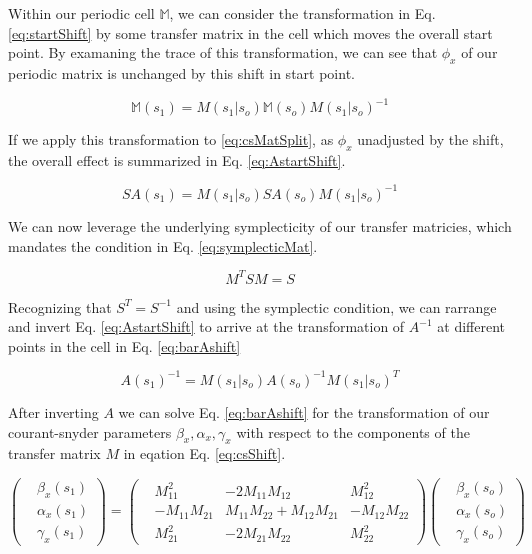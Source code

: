 Within our periodic cell $\mathbb{M}$, we can consider the transformation in Eq. \ref{eq:startShift} by some transfer matrix in the cell which moves the overall start point. By examaning the trace of this transformation, we can see that $\phi_x$ of our periodic matrix is unchanged by this shift in start point.

\begin{equation} \label{eq:startShift}
	\mathbb{M}(s_1)  = M(s_1|s_o)\mathbb{M}(s_o)M(s_1|s_o)^{-1}
\end{equation}

If we apply this transformation to \ref{eq:csMatSplit}, as $\phi_x$ unadjusted by the shift, the overall effect is summarized in Eq. \ref{eq:AstartShift}.

\begin{equation} \label{eq:AstartShift}
	S A(s_1) = M(s_1|s_o) S A(s_o)M(s_1|s_o)^{-1}
\end{equation}

We can now leverage the underlying symplecticity of our transfer matricies, which mandates the condition in Eq. \ref{eq:symplecticMat}.

\begin{equation} \label{eq:symplecticMat}
	M^T S M = S
\end{equation}

Recognizing that $S^T = S^{-1}$ and using the symplectic condition, we can rarrange and invert Eq. \ref{eq:AstartShift} to arrive at the transformation of $A^{-1}$ at different points in the cell in Eq. \ref{eq:barAshift} 

\begin{equation} \label{eq:barAshift}
	A(s_1)^{-1} = M(s_1|s_o)  A(s_o)^{-1} M(s_1|s_o)^T
\end{equation}

After inverting $A$ we can solve Eq. \ref{eq:barAshift} for the transformation of our courant-snyder parameters $\beta_x, \alpha_x, \gamma_x$ with respect to the components of the transfer matrix $M$ in eqation Eq. \ref{eq:csShift}.

\begin{equation} \label{eq:csShift}
	\begin{pmatrix} &\beta_x(s_1) \\ &\alpha_x(s_1)\\ &\gamma_x(s_1) \end{pmatrix} = 
	\begin{pmatrix}
		&M_{11}^2 &-2 M_{11} M_{12} &M_{12}^2\\
		&-M_{11} M_{21} &M_{11} M_{22} + M_{12} M_{21} &-M_{12}M_{22}\\
		&M_{21}^2 &-2 M_{21} M_{22} &M_{22}^2
	\end{pmatrix}
	\begin{pmatrix} &\beta_x(s_o) \\ &\alpha_x(s_o)\\ &\gamma_x(s_o) \end{pmatrix}
\end{equation}

